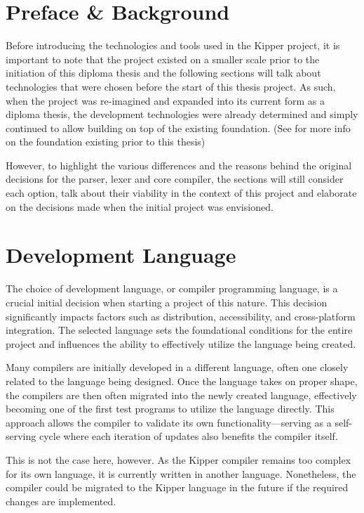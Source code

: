 \section{Preface \& Background}

Before introducing the technologies and tools used in the Kipper project, it is important to note that the project existed on a smaller scale prior to the initiation of this diploma thesis and the following sections will talk about technologies that were chosen before the start of this thesis project. As such, when the project was re-imagined and expanded into its current form as a diploma thesis, the development technologies were already determined and simply continued to allow building on top of the existing foundation. (See  for more info on the foundation existing prior to this thesis)

However, to highlight the various differences and the reasons behind the original decisions for the parser, lexer and core compiler, the sections will still consider each option, talk about their viability in the context of this project and elaborate on the decisions made when the initial project was envisioned.

\section{Development Language}

The choice of development language, or compiler programming language, is a crucial initial decision when starting a project of this nature. This decision significantly impacts factors such as distribution, accessibility, and cross-platform integration. The selected language sets the foundational conditions for the entire project and influences the ability to effectively utilize the language being created.

Many compilers are initially developed in a different language, often one closely related to the language being designed. Once the language takes on proper shape, the compilers are then often migrated into the newly created language, effectively becoming one of the first test programs to utilize the language directly. This approach allows the compiler to validate its own functionality—serving as a self-serving cycle where each iteration of updates also benefits the compiler itself.

This is not the case here, however. As the Kipper compiler remains too complex for its own language, it is currently written in another language. Nonetheless, the compiler could be migrated to the Kipper language in the future if the required changes are implemented.

